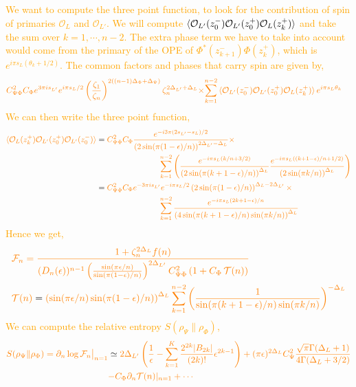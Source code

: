 \documentclass[11pt]{article}
\newcommand{\ep}{\epsilon}
\newcommand{\p}{\partial}
\newcommand{\mO}{\mathcal{O}}
\newcommand{\nn}{\nonumber}
\newcommand{\lb}{\left(}
\newcommand{\rb}{\right)}
\newcommand{\JM}[1]{\textcolor{orange}{#1}}
\begin{document}
\JM{We want to compute the three point function, to look for the contribution of spin of primaries $\mO_L$ and $\mO_{L'}$. We will compute $\braket{\mO_{L'}(z_0^-) \mO_{L'}(z_0^+) \mO_L(z_k^+)}$ and take the sum over $k =1,\cdots , n-2$. The extra phase term we have to take into account would come from the primary of the OPE of $\Phi^*(z_{k+1}^-) \Phi(z_k^+)$, which is $e^{i \pi s_L(\theta_k + 1/2)}$. The common factors and phases that carry spin are given by,}
\begin{align}
    &\JM{C_{\Psi\Phi}^2C_\Phi e^{3\pi is_{L'}}e^{i\pi s_L/2}\lb\frac{\zeta_1}{\zeta_n}\rb^{2((n-1)\Delta_\Phi + \Delta_\Psi)}\zeta_n^{2\Delta_{L'} + \Delta_L}\times} 
    \JM{\sum_{k=1}^{n-2}\braket{\mO_{L'}(z_0^-) \mO_{L'}(z_0^+) \mO_L(z_k^+)} e^{i \pi s_L \theta_k} }
\end{align}
\JM{We can then write the three point function,}
\begin{align}
    \JM{\braket{\mO_L(z_k^+) \mO_{L'}(z_0^+)\mO_{L'}(z_0^-) }} &= \JM{C_{\Psi\Phi}^2C_\Phi\frac{e^{-i3\pi (2s_{L'} -s_L)/2}}{\lb2\sin(\pi(1-\ep)/n)\rb^{2\Delta_{L'}-\Delta_L}}\times}\nn \\ 
    & \qquad \qquad \qquad \qquad 
    \JM{\sum_{k=1}^{n-2}\Bigg( \frac{e^{-i\pi s_L(k/n+3/2)}}{\lb2\sin(\pi(k+1-\ep)/n)\rb^{\Delta_L}} \frac{e^{-i\pi s_L((k+1-\ep)/n+1/2)}}{\lb 2\sin(\pi k/n)\rb^{\Delta_L}}\Bigg)} \nn \\
    &= \JM{C_{\Psi\Phi}^2C_\Phi e^{-3\pi is_{L'} } e^{-i\pi s_L/2}\lb 2\sin (\pi (1-\ep)/n)\rb^{\Delta_L-2\Delta_{L'}}\times }\nn \\
    &\qquad \qquad \qquad \qquad \JM{\sum_{k=1}^{n-2}\frac{e^{-i\pi s_L (2k+1-\ep)/n}}{\lb  4\sin(\pi (k+1-\ep)/n)\sin(\pi k /n)\rb^{\Delta_L}}} 
\end{align}
\JM{Hence we get,}
\begin{align}
    &\JM{\mathcal{F}_n = \frac{1+ \zeta_n^{2\Delta_L}f(n)}{(D_n(\ep))^{n-1}\lb \frac{\sin(\pi \ep/n)}{\sin (\pi(1-\ep)/n)}\rb^{2\Delta_{L'}}C_{\Psi \Phi}^2
    \lb 1 + C_\Phi \, \mathcal{T}(n)\rb} } \\
    &\JM{\mathcal{T}(n)} = \JM{\lb \sin(\pi \ep/n) \sin(\pi (1-\ep)/n) \rb^{\Delta_L}\sum_{k=1}^{n-2} \lb \frac{1}{\sin(\pi (k+1-\ep)/n) \sin (\pi k /n)}\rb^{-\Delta_L}}
\end{align}
\JM{We can compute the relative entropy $S(\rho_\Psi \| \rho_\Phi)$,}
\begin{align}
    \JM{S(\rho_\Psi \| \rho_\Phi) = \p_n \log \mathcal{F}_n \big|_{n=1}} & \simeq  \JM{2\Delta_{L'}\lb  \frac{1}{\ep} - \sum_{k=1}^{K} \frac{2^{2k}|B_{2k}|} {(2k)!}\ep^{2k-1}
    \rb + (\pi \ep)^{2\Delta_L}C_{\Psi}^2\frac{\sqrt{\pi}\Gamma(\Delta_L+1)}{4\Gamma(\Delta_L+3/2)} } \nn \\ &   \JM{- C_\Phi  \p_n \mathcal{T}(n)|_{n=1} + \cdots  }
\end{align}
\end{document}
